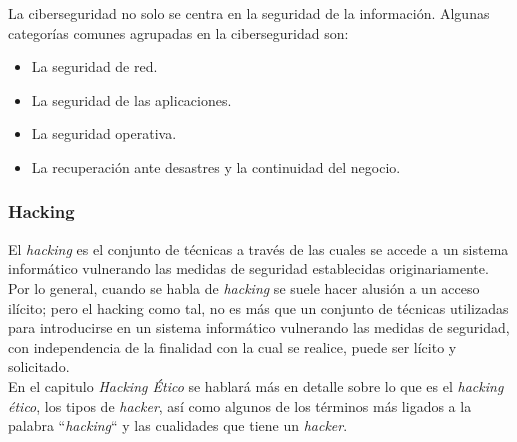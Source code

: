 La ciberseguridad no solo se centra en la seguridad de la información. Algunas categorías comunes agrupadas en la ciberseguridad son:
\begin{itemize}
    \item La seguridad de red.
    \item La seguridad de las aplicaciones.
    \item La seguridad operativa.
    \item La recuperación ante desastres y la continuidad del negocio.
\end{itemize}

\subsubsection{Hacking}

El \textit{hacking} es el conjunto de técnicas a través de las cuales se accede a un sistema informático vulnerando las medidas de seguridad establecidas originariamente. Por lo general, cuando se habla de \textit{hacking} se suele hacer alusión a un acceso ilícito; pero el hacking como tal, no es más que un conjunto de técnicas utilizadas para introducirse en un sistema informático vulnerando las medidas de seguridad, con independencia de la finalidad con la cual se realice, puede ser lícito y solicitado.\\

En el capitulo \textit{Hacking Ético} se hablará más en detalle sobre lo que es el \textit{hacking ético}, los tipos de \textit{hacker}, así como algunos de los términos más ligados a la palabra ``\textit{hacking}`` y las cualidades que tiene un \textit{hacker}.